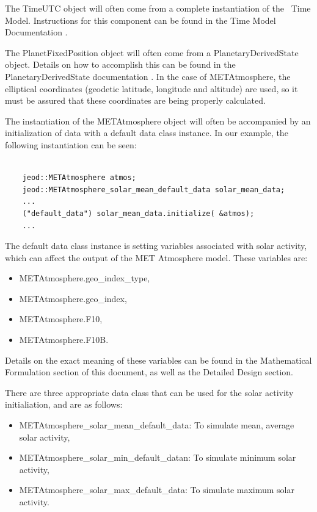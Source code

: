 The TimeUTC object will often come from a complete instantiation of the
\JEODid\ Time Model. Instructions for this component can be found in the
Time Model Documentation \cite{dynenv:TIME}.

The PlanetFixedPosition object will often come from a PlanetaryDerivedState
object. Details on how to accomplish this can be found in the PlanetaryDerivedState
documentation \cite{dynenv:DERIVEDSTATE}. In the case of METAtmosphere, the
elliptical coordinates (geodetic latitude, longitude and altitude) are used, so
it must be assured that these coordinates are being properly calculated.

The instantiation of the METAtmosphere object will often be accompanied by
an initialization of data with a default data class instance. In our example,
the following instantiation can be seen:

\begin{verbatim}

    jeod::METAtmosphere atmos;
    jeod::METAtmosphere_solar_mean_default_data solar_mean_data;
    ...
    ("default_data") solar_mean_data.initialize( &atmos);
    ...

\end{verbatim}

The default data class instance is setting variables associated with solar
activity, which can affect the output of the MET Atmosphere model. These
variables are:

\begin{itemize}
\item METAtmosphere.geo\_index\_type,
\item METAtmosphere.geo\_index,
\item METAtmosphere.F10,
\item METAtmosphere.F10B.
\end{itemize}

Details on the exact meaning of these variables can be found in the Mathematical
Formulation section of this document, as well as the Detailed Design section.

There are three appropriate data class that can be used for the solar activity
initialiation, and are as follows:

\begin{itemize}
\item METAtmosphere\_solar\_mean\_default\_data: To simulate mean, average solar activity,
\item METAtmosphere\_solar\_min\_default\_datan: To simulate minimum solar activity,
\item METAtmosphere\_solar\_max\_default\_data: To simulate maximum solar activity.
\end{itemize}

